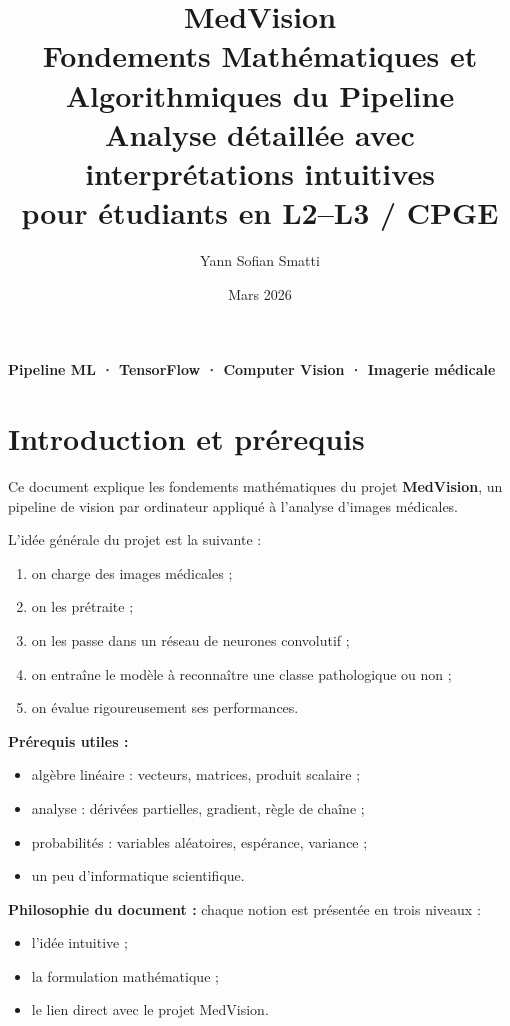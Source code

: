 ﻿\documentclass[11pt,a4paper]{article}
\title{\textbf{MedVision}\\
Fondements Mathématiques et Algorithmiques du Pipeline\\
\large Analyse détaillée avec interprétations intuitives\\
pour étudiants en L2--L3 / CPGE}
\author{Yann Sofian Smatti}
\date{Mars 2026}
\begin{document}
\maketitle

\begin{center}
\textbf{Pipeline ML · TensorFlow · Computer Vision · Imagerie médicale}
\end{center}

\tableofcontents
\newpage

\section{Introduction et prérequis}

Ce document explique les fondements mathématiques du projet \textbf{MedVision},
un pipeline de vision par ordinateur appliqué à l'analyse d'images médicales.

L'idée générale du projet est la suivante :
\begin{enumerate}[label=\arabic*)]
    \item on charge des images médicales ;
    \item on les prétraite ;
    \item on les passe dans un réseau de neurones convolutif ;
    \item on entraîne le modèle à reconnaître une classe pathologique ou non ;
    \item on évalue rigoureusement ses performances.
\end{enumerate}

\textbf{Prérequis utiles :}
\begin{itemize}
    \item algèbre linéaire : vecteurs, matrices, produit scalaire ;
    \item analyse : dérivées partielles, gradient, règle de chaîne ;
    \item probabilités : variables aléatoires, espérance, variance ;
    \item un peu d’informatique scientifique.
\end{itemize}

\textbf{Philosophie du document :} chaque notion est présentée en trois niveaux :
\begin{itemize}
    \item l’idée intuitive ;
    \item la formulation mathématique ;
    \item le lien direct avec le projet MedVision.
\end{itemize}
\end{document}
